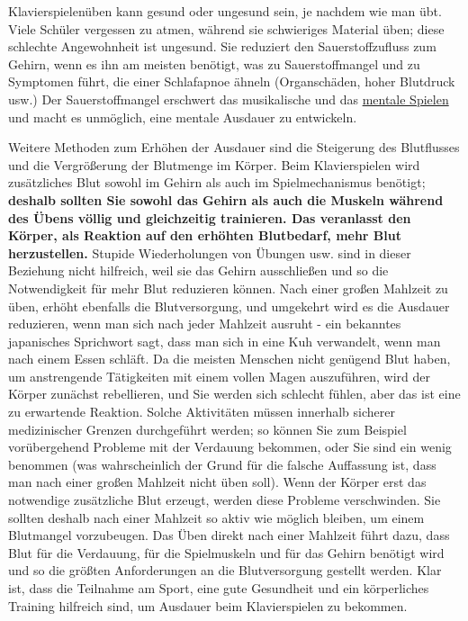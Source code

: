 Klavierspielenüben kann gesund oder ungesund sein, je nachdem wie man übt.
Viele Schüler vergessen zu atmen, während sie schwieriges Material üben; diese schlechte Angewohnheit ist ungesund.
Sie reduziert den Sauerstoffzufluss zum Gehirn, wenn es ihn am meisten benötigt, was zu Sauerstoffmangel und zu Symptomen führt, die einer Schlafapnoe ähneln (Organschäden, hoher Blutdruck usw.)
Der Sauerstoffmangel erschwert das musikalische und das \hyperref[c1ii12mental]{mentale Spielen} und macht es unmöglich, eine mentale Ausdauer zu entwickeln.

Weitere Methoden zum Erhöhen der Ausdauer sind die Steigerung des Blutflusses und die Vergrößerung der Blutmenge im Körper.
Beim Klavierspielen wird zusätzliches Blut sowohl im Gehirn als auch im Spielmechanismus benötigt; \textbf{deshalb sollten Sie sowohl das Gehirn als auch die Muskeln während des Übens völlig und gleichzeitig trainieren.
Das veranlasst den Körper, als Reaktion auf den erhöhten Blutbedarf, mehr Blut herzustellen.}
Stupide Wiederholungen von Übungen usw. sind in dieser Beziehung nicht hilfreich, weil sie das Gehirn ausschließen und so die Notwendigkeit für mehr Blut reduzieren können.
Nach einer großen Mahlzeit zu üben, erhöht ebenfalls die Blutversorgung, und umgekehrt wird es die Ausdauer reduzieren, wenn man sich nach jeder Mahlzeit ausruht - ein bekanntes japanisches Sprichwort sagt, dass man sich in eine Kuh verwandelt, wenn man nach einem Essen schläft.
Da die meisten Menschen nicht genügend Blut haben, um anstrengende Tätigkeiten mit einem vollen Magen auszuführen, wird der Körper zunächst rebellieren, und Sie werden sich schlecht fühlen, aber das ist eine zu erwartende Reaktion.
Solche Aktivitäten müssen innerhalb sicherer medizinischer Grenzen durchgeführt werden; so können Sie zum Beispiel vorübergehend Probleme mit der Verdauung bekommen, oder Sie sind ein wenig benommen (was wahrscheinlich der Grund für die falsche Auffassung ist, dass man nach einer großen Mahlzeit nicht üben soll).
Wenn der Körper erst das notwendige zusätzliche Blut erzeugt, werden diese Probleme verschwinden.
Sie sollten deshalb nach einer Mahlzeit so aktiv wie möglich bleiben, um einem Blutmangel vorzubeugen.
Das Üben direkt nach einer Mahlzeit führt dazu, dass Blut für die Verdauung, für die Spielmuskeln und für das Gehirn benötigt wird und so die größten Anforderungen an die Blutversorgung gestellt werden.
Klar ist, dass die Teilnahme am Sport, eine gute Gesundheit und ein körperliches Training hilfreich sind, um Ausdauer beim Klavierspielen zu bekommen.

